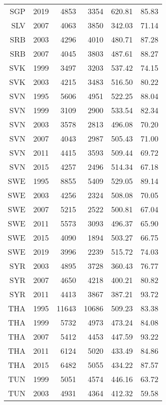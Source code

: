 \begin{longtable}{|r|r|r|r|r|r|}
    SGP   & 2019  & 4853  & 3354  & 620.81 & 85.83 \\
    SLV   & 2007  & 4063  & 3850  & 342.03 & 71.14 \\
    SRB   & 2003  & 4296  & 4010  & 480.71 & 87.28 \\
    SRB   & 2007  & 4045  & 3803  & 487.61 & 88.27 \\
    SVK   & 1999  & 3497  & 3203  & 537.42 & 74.15 \\
    SVK   & 2003  & 4215  & 3483  & 516.50 & 80.22 \\
    SVN   & 1995  & 5606  & 4951  & 522.25 & 88.04 \\
    SVN   & 1999  & 3109  & 2900  & 533.54 & 82.34 \\
    SVN   & 2003  & 3578  & 2813  & 496.08 & 70.20 \\
    SVN   & 2007  & 4043  & 2987  & 505.43 & 71.00 \\
    SVN   & 2011  & 4415  & 3593  & 509.44 & 69.72 \\
    SVN   & 2015  & 4257  & 2496  & 514.34 & 67.18 \\
    SWE   & 1995  & 8855  & 5409  & 529.05 & 89.14 \\
    SWE   & 2003  & 4256  & 2324  & 508.08 & 70.05 \\
    SWE   & 2007  & 5215  & 2522  & 500.81 & 67.04 \\
    SWE   & 2011  & 5573  & 3093  & 496.37 & 65.90 \\
    SWE   & 2015  & 4090  & 1894  & 503.27 & 66.75 \\
    SWE   & 2019  & 3996  & 2239  & 515.72 & 74.03 \\
    SYR   & 2003  & 4895  & 3728  & 360.43 & 76.77 \\
    SYR   & 2007  & 4650  & 4218  & 400.21 & 80.82 \\
    SYR   & 2011  & 4413  & 3867  & 387.21 & 93.72 \\
    THA   & 1995  & 11643 & 10686 & 509.23 & 83.38 \\
    THA   & 1999  & 5732  & 4973  & 473.24 & 84.08 \\
    THA   & 2007  & 5412  & 4453  & 447.59 & 93.22 \\
    THA   & 2011  & 6124  & 5020  & 433.49 & 84.86 \\
    THA   & 2015  & 6482  & 5055  & 434.22 & 87.57 \\
    TUN   & 1999  & 5051  & 4574  & 446.16 & 63.72 \\
    TUN   & 2003  & 4931  & 4364  & 412.32 & 59.58 \\

\end{longtable}

